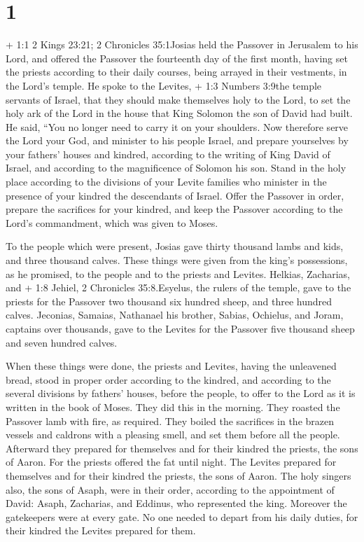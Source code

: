\hypertarget{section}{%
\section{1}\label{section}}

 + 1:1 2 Kings 23:21; 2 Chronicles 35:1Josias held the
Passover in Jerusalem to his Lord, and offered the Passover the
fourteenth day of the first month,  having set the priests
according to their daily courses, being arrayed in their vestments, in
the Lord's temple.  He spoke to the Levites, + 1:3 Numbers
3:9the temple servants of Israel, that they should make themselves holy
to the Lord, to set the holy ark of the Lord in the house that King
Solomon the son of David had built.  He said, ``You no
longer need to carry it on your shoulders. Now therefore serve the Lord
your God, and minister to his people Israel, and prepare yourselves by
your fathers' houses and kindred,  according to the writing
of King David of Israel, and according to the magnificence of Solomon
his son. Stand in the holy place according to the divisions of your
Levite families who minister in the presence of your kindred the
descendants of Israel.  Offer the Passover in order, prepare
the sacrifices for your kindred, and keep the Passover according to the
Lord's commandment, which was given to Moses.

 To the people which were present, Josias gave thirty
thousand lambs and kids, and three thousand calves. These things were
given from the king's possessions, as he promised, to the people and to
the priests and Levites.  Helkias, Zacharias, and + 1:8
Jehiel, 2 Chronicles 35:8.Esyelus, the rulers of the temple, gave to the
priests for the Passover two thousand six hundred sheep, and three
hundred calves.  Jeconias, Samaias, Nathanael his brother,
Sabias, Ochielus, and Joram, captains over thousands, gave to the
Levites for the Passover five thousand sheep and seven hundred calves.

 When these things were done, the priests and Levites,
having the unleavened bread, stood in proper order according to the
kindred,  and according to the several divisions by
fathers' houses, before the people, to offer to the Lord as it is
written in the book of Moses. They did this in the morning.
 They roasted the Passover lamb with fire, as required.
They boiled the sacrifices in the brazen vessels and caldrons with a
pleasing smell,  and set them before all the people.
Afterward they prepared for themselves and for their kindred the
priests, the sons of Aaron.  For the priests offered the
fat until night. The Levites prepared for themselves and for their
kindred the priests, the sons of Aaron.  The holy singers
also, the sons of Asaph, were in their order, according to the
appointment of David: Asaph, Zacharias, and Eddinus, who represented the
king.  Moreover the gatekeepers were at every gate. No one
needed to depart from his daily duties, for their kindred the Levites
prepared for them.


